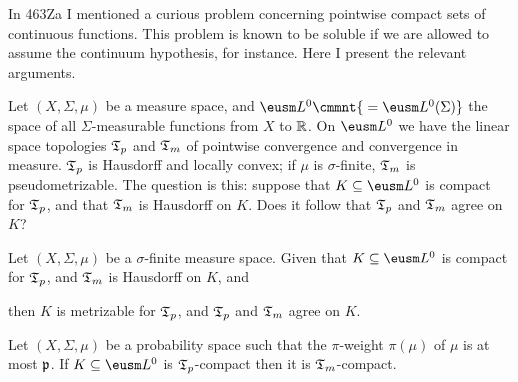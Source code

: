 
\def\chaptername{Topologies and measures III}
\def\sectionname{Alexandra Bellow's problem}


In 463Za I mentioned a curious problem concerning pointwise compact sets
of continuous functions.   This problem is known to be soluble if we are
allowed to assume the continuum hypothesis, for instance.   Here I
present the relevant arguments.

Let $(X,\Sigma,\mu)$ be a measure space, and
$\eusm L^0\cmmnt{\mskip5mu =\eusm L^0(\Sigma)}$ the space of all
$\Sigma$-measurable functions from $X$ to $\Bbb R$.   On $\eusm L^0$ we have
the linear space topologies $\frak T_p$ and $\frak T_m$ of pointwise
convergence and convergence in measure.
$\frak T_p$ is Hausdorff and locally convex;  if $\mu$ is $\sigma$-finite,
$\frak T_m$ is pseudometrizable.
The question is this:  suppose that
$K\subseteq\eusm L^0$ is compact for $\frak T_p$,
and that $\frak T_m$ is Hausdorff on $K$.   Does it follow that
$\frak T_p$ and $\frak T_m$ agree on $K$?

 Let $(X,\Sigma,\mu)$ be a $\sigma$-finite
measure space.   Given that $K\subseteq\eusm L^0$ is compact
for $\frak T_p$, and $\frak T_m$ is Hausdorff on $K$, and


\noindent then $K$ is metrizable for $\frak T_p$, and $\frak T_p$ and
$\frak T_m$ agree on $K$.


   Let $(X,\Sigma,\mu)$ be a probability space
such that the $\pi$-weight $\pi(\mu)$ of $\mu$ is at most $\frak p$.   If
$K\subseteq\eusm L^0$ is $\frak T_p$-compact then it is
$\frak T_m$-compact.

